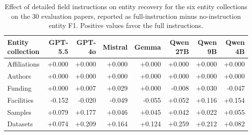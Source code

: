 \begin{table}[!t]
  \centering
  \small
  \setlength{\tabcolsep}{4pt}
  \begin{tabular}{@{}p{}rrrrrrr@{}}
    \toprule
    Entity collection & GPT-5.5 & GPT-4o & Mistral & Gemma & Qwen 27B & Qwen 9B & Qwen 4B \\
    \midrule
    Affiliations & +0.000 & +0.000 & +0.000 & +0.000 & +0.000 & +0.000 & +0.000 \\
    Authors & +0.000 & +0.000 & +0.000 & +0.000 & +0.000 & +0.000 & +0.000 \\
    Funding & +0.000 & +0.007 & +0.029 & +0.000 & -0.008 & +0.030 & -0.047 \\
    Facilities & -0.152 & -0.020 & -0.049 & -0.055 & +0.052 & +0.116 & +0.154 \\
    Samples & +0.079 & +0.177 & +0.046 & +0.045 & +0.042 & +0.022 & +0.055 \\
    Datasets & +0.074 & +0.209 & +0.164 & +0.124 & +0.259 & +0.212 & +0.082 \\
    \bottomrule
  \end{tabular}
  \caption{Effect of detailed field instructions on entity recovery
  for the six entity collections on the 30 evaluation papers,
  reported as full-instruction minus no-instruction entity F1.
  Positive values favor the full instructions.}
  \label{tab:instruction-effects}
\end{table}
